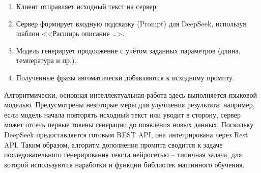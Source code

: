 \begin{enumerate}[label=\arabic*]
    \item Клиент отправляет исходный текст на сервер.
    \item Сервер формирует входную подсказку (Prompt) для DeepSeek, используя шаблон <<Расширь описание \dots>.
    \item Модель генерирует продолжение с учётом заданных параметров (длина, температура и пр.).
    \item Полученные фразы автоматически добавляются к исходному промпту.

\end{enumerate}

Алгоритмически, основная интеллектуальная работа здесь выполняется языковой моделью. Предусмотрены некоторые меры для улучшения результата: например, если модель начала повторять исходный текст или уводит в сторону, сервер может отсечь первые токены генерации до появления новых данных. Поскольку DeepSeek предоставляется готовым REST API, она интегрирована через Rest API.  Таким образом, алгоритм дополнения промпта сводится к задаче последовательного генерирования текста нейросетью – типичная задача, для которой используются наработки и функции библиотек машинного обучения.

